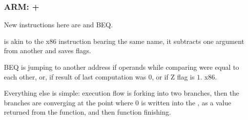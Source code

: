 \subsubsection{ARM: \OptimizingKeil + \ThumbMode}



{New instructions here are \CMP and \ac{BEQ}.}

\CMP {}
{is akin to the x86 instruction bearing the same name, it subtracts one argument from another and saves flags.}

\ac{BEQ} 
{is jumping to another address if operands while comparing were equal to each other, or,
if result of last computation was $0$, or if Z flag is $1$.}
 x86.

{Everything else is simple: execution flow is forking into two branches, then the branches are 
converging at the point
where $0$ is written into the \Rzero, as a value returned from the function, and then function finishing.}


